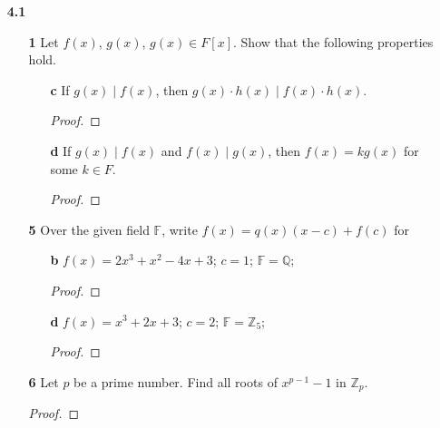 \documentclass[paper=usletter, fontsize=12pt]{article}
\begin{document}

    \begin{itemize}

        \item[\textbf{4.1}]
        \begin{enumerate}

            \item[\textbf{1}] Let $f(x)$, $g(x)$, $g(x) \in F[x]$. Show that
            the following properties hold.
            \begin{enumerate}

                \item[\textbf{c}] If $g(x) \mid f(x)$, then $g(x) \cdot h(x)
                \mid f(x) \cdot h(x)$.
                \begin{proof}
                \end{proof}

                \item[\textbf{d}] If $g(x) \mid f(x)$ and $f(x) \mid g(x)$,
                then $f(x)=kg(x)$ for some $k\in F$.
                \begin{proof}
                \end{proof}

            \end{enumerate}

            \item[\textbf{5}] Over the given field $\mathbb{F}$, write
            $f(x)=q(x)(x-c)+f(c)$ for
            \begin{enumerate}

                \item[\textbf{b}] $f(x)=2x^3+x^2-4x+3$; $c=1$;
                $\mathbb{F}=\mathbb{Q}$;
                \begin{proof}
                \end{proof}

                \item[\textbf{d}] $f(x)=x^3+2x+3$; $c=2$;
                $\mathbb{F}=\mathbb{Z}_5$;
                \begin{proof}
                \end{proof}

            \end{enumerate}

            \item[\textbf{6}] Let $p$ be a prime number. Find all roots of
            $x^{p-1}-1$ in $\mathbb{Z}_p$.
            \begin{proof}
            \end{proof}


\end{enumerate}
\end{itemize}
\end{document}
